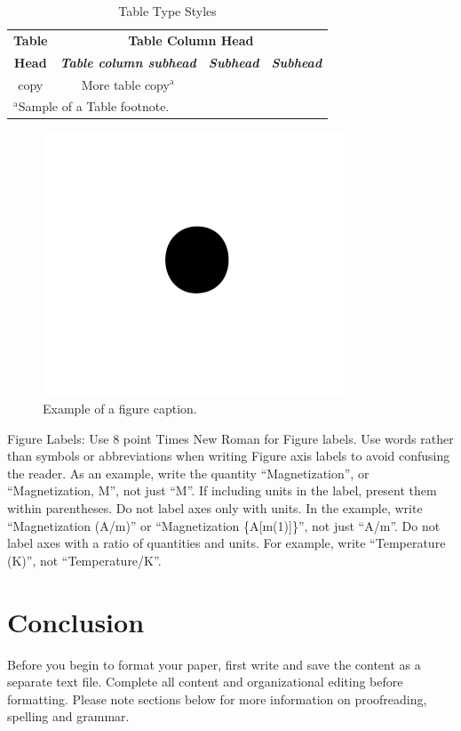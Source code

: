 \documentclass[conference]{IEEEtran}
\begin{document}
\begin{table}[htbp]
\caption{Table Type Styles}
\begin{center}
\begin{tabular}{|c|c|c|c|}
\hline
\textbf{Table}&\multicolumn{3}{|c|}{\textbf{Table Column Head}} \\
\cline{2-4} 
\textbf{Head} & \textbf{\textit{Table column subhead}}& \textbf{\textit{Subhead}}& \textbf{\textit{Subhead}} \\
\hline
copy& More table copy$^{\mathrm{a}}$& &  \\
\hline
\multicolumn{4}{l}{$^{\mathrm{a}}$Sample of a Table footnote.}
\end{tabular}
\label{tab1}
\end{center}
\end{table}

\begin{figure}[htbp]
\centerline{\includegraphics{fig1.png}}
\caption{Example of a figure caption.}
\label{fig}
\end{figure}

Figure Labels: Use 8 point Times New Roman for Figure labels. Use words 
rather than symbols or abbreviations when writing Figure axis labels to 
avoid confusing the reader. As an example, write the quantity 
``Magnetization'', or ``Magnetization, M'', not just ``M''. If including 
units in the label, present them within parentheses. Do not label axes only 
with units. In the example, write ``Magnetization (A/m)'' or ``Magnetization 
\{A[m(1)]\}'', not just ``A/m''. Do not label axes with a ratio of 
quantities and units. For example, write ``Temperature (K)'', not 
``Temperature/K''.

\section{Conclusion}
Before you begin to format your paper, first write and save the content as a 
separate text file. Complete all content and organizational editing before 
formatting. Please note sections below for more information on 
proofreading, spelling and grammar.
\end{document}
